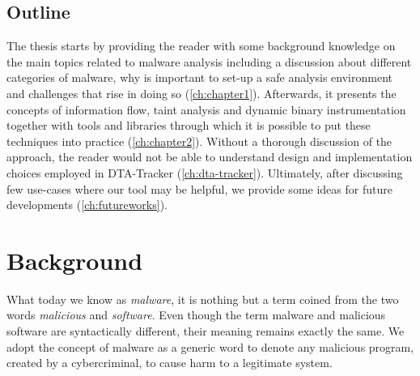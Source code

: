 \documentclass[LaM,binding=0.6cm]{sapthesis}
\begin{document}
\section{Outline}
The thesis starts by providing the reader with some background knowledge on the main topics related to malware analysis including a discussion about different categories of malware, why is important to set-up a safe analysis environment and challenges that rise in doing so (\autoref{ch:chapter1}). Afterwards, it presents the concepts of information flow, taint analysis and dynamic binary instrumentation  together with tools and libraries through which it is possible to put these techniques into practice (\autoref{ch:chapter2}). Without a thorough discussion of the approach, the reader would not be able to understand design and implementation choices employed in DTA-Tracker (\autoref{ch:dta-tracker}). Ultimately, after discussing few use-cases where our tool may be helpful, we provide some ideas for future developments (\autoref{ch:futureworks}).

\chapter{Background}
\label{ch:chapter1}
What today we know as \textit{malware}, it is nothing but a term coined from the two words \textit{malicious} and \textit{software}. Even though the term malware and malicious software are syntactically different, their meaning remains exactly the same. We adopt the concept of malware as a generic word to denote any malicious program, created by a cybercriminal, to cause harm to a legitimate system.\\
\end{document}
